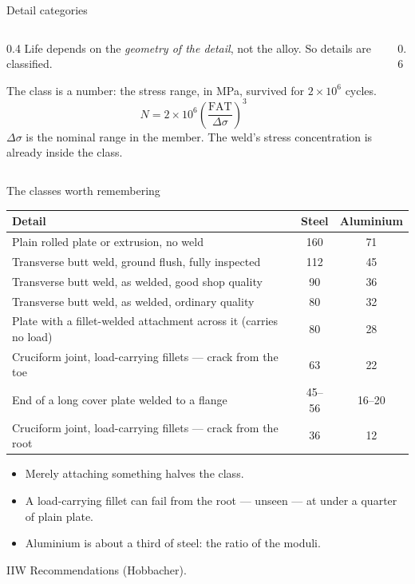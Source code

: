 \documentclass[aspectratio=169,10pt]{beamer}
\begin{document}
\begin{frame}{Detail categories}
\begin{columns}[c]
\begin{column}{0.4\textwidth}
Life depends on the \emph{geometry of the detail}, not the alloy. So details are classified.

\medskip
The class is a number: the stress range, in MPa, survived for $2\times10^{6}$ cycles.
\[ N=2\times10^{6}\left(\frac{\mathrm{FAT}}{\Delta\sigma}\right)^{3} \]
$\Delta\sigma$ is the \alert{nominal} range in the member. The weld's stress concentration is
already inside the class.
\end{column}
\begin{column}{0.6\textwidth}
\resizebox{\textwidth}{!}{}
\end{column}
\end{columns}
\end{frame}

\begin{frame}{The classes worth remembering}
\centering\small
\begin{tabular}{@{}lcc@{}}
\toprule
\textbf{Detail} & \textbf{Steel} & \textbf{Aluminium}\\
\midrule
Plain rolled plate or extrusion, no weld & 160 & 71\\
Transverse butt weld, ground flush, fully inspected & 112 & 45\\
Transverse butt weld, as welded, good shop quality & 90 & 36\\
Transverse butt weld, as welded, ordinary quality & 80 & 32\\
Plate with a fillet-welded attachment across it (carries no load) & 80 & 28\\
Cruciform joint, load-carrying fillets --- crack from the toe & 63 & 22\\
End of a long cover plate welded to a flange & 45--56 & 16--20\\
Cruciform joint, load-carrying fillets --- crack from the root & 36 & 12\\
\bottomrule
\end{tabular}

\vfill\raggedright\normalsize
\begin{itemize}
  \item Merely \alert{attaching} something halves the class.
  \item A load-carrying fillet can fail from the \alert{root} --- unseen --- at under a quarter of plain plate.
  \item Aluminium is about a third of steel: the ratio of the moduli.
\end{itemize}
{\footnotesize IIW Recommendations (Hobbacher).}
\end{frame}
\end{document}
